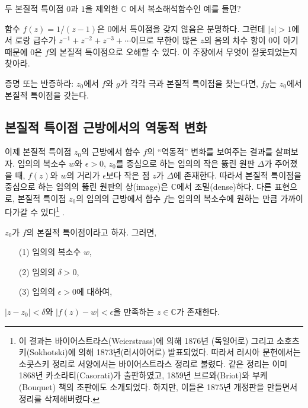 \begin{salt_exercise}\label{ex-4-36}
두 본질적 특이점 $0$과 $1$을 제외한  $\mathbb C$ 에서
복소해석함수인 예를 들면?
\end{salt_exercise}

\begin{salt_exercise}\label{ex-4-37}
함수 $f(z) = 1/(z-1)$은 $0$에서 특이점을 갖지 않음은 분명하다.
그런데 $|z|>1$에서 로랑 급수가 $z^{-1} + z^{-2} + z^{-3} + \cdots$이므로
무한이 많은 $z$의 음의 차수 항이 $0$이 아기 때문에
$0$은 $f$의 본질적 특이점으로 오해할 수 있다. 
이 주장에서 무엇이 잘못되었는지 찾아라.
\end{salt_exercise}

\begin{salt_exercise}\label{ex-4-38}
증명 또는 반증하라:
$z_0$에서 $f$와 $g$가 각각 극과 본질적 특이점을 찾는다면,
$fg$는 $z_0$에서 본질적 특이점을 갖는다.
\end{salt_exercise}

\subsection{본질적 특이점 근방에서의 역동적 변화}

이제 본질적 특이점 $z_0$의 근방에서 함수 $f$의
``역동적'' 변화를 보여주는 결과를 살펴보자. 
임의의 복소수 $w$와 $\epsilon>0$, 
$z_0$를 중심으로 하는 임의의 작은 뚫린 원판 $\Delta$가
주어졌을 때, 
$f(z)$와 $w$의 거리가 $\epsilon$보다 작은 점 $z$가
$\Delta$에 존재한다. 따라서
본질적 특이점을 중심으로 하는 임의의 뚫린 원판의 상(image)은
$\mathbb C$에서 조밀(dense)하다.
다른 표현으로, 본질적 특이점 $z_0$의 임의의 근방에서
함수 $f$는 임의의 복소수에 원하는 만큼 가까이 다가갈 수 있다\footnote{
이 결과는 바이어스트라스(Weierstrass)에 의해
1876년 (독일어로) 그리고
소호츠키(Sokhotski)에 의해 1873년(러시아어로) 발표되었다.
따라서 러시아 문헌에서는 소콧스키 정리로
서양에서는 바이어스트라스 정리로 불렸다. 
같은 정리는 이미 1868년 카소라티(Casorati)가 출판하였고,
1859년 브르와(Briot)와 부케(Bouquet) 책의 초판에도 소개되었다.
하지만, 이들은 1875년 개정판을 만들면서 정리를 삭제해버렸다.
} .

\begin{salttheorem}  {}{}
\label{thm-4-10}
$z_0$가 $f$의 본질적 특이점이라고 하자. 그러면,
\begin{itemize}
\item[(1)] 임의의 복소수 $w$,
\item[(2)] 임의의 $\delta>0$,
\item[(3)] 임의의 $\epsilon>0$에 대하여,
\end{itemize}
$|z-z_0| <\delta$와 $|f(z) - w| < \epsilon$을 만족하는 
$z\in\mathbb C$가 
존재한다.
\end{salttheorem}

